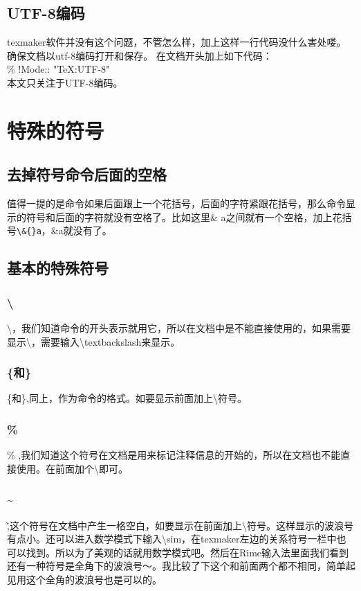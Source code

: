 \documentclass[12pt,oneside]{book}
\begin{document}
\begin{common-format}
\subsection{UTF-8编码}
texmaker软件并没有这个问题，不管怎么样，加上这样一行代码没什么害处喽。确保文档以utf-8编码打开和保存。
在文档开头加上如下代码：\\
\% !Mode:: "TeX:UTF-8" \\
本文只关注于UTF-8编码。


\section{特殊的符号}
\label{sec:symbols}
\subsection{去掉符号命令后面的空格}
值得一提的是命令如果后面跟上一个花括号，后面的字符紧跟花括号，那么命令显示的符号和后面的字符就没有空格了。比如这里\& a之间就有一个空格，加上花括号\verb+\&{}a+，\&{}a就没有了。

\subsection{基本的特殊符号}
\subsubsection{\textbackslash}
\textbackslash ，我们知道命令的开头表示就用它，所以在文档中是不能直接使用的，如果需要显示\textbackslash ，需要输入\textbackslash textbackslash来显示。

\subsubsection{\{和\}}
\{和\},同上，作为命令的格式。如要显示前面加上\textbackslash 符号。

\subsubsection{\%}
\% ,我们知道这个符号在文档是用来标记注释信息的开始的，所以在文档也不能直接使用。在前面加个\textbackslash 即可。

\subsubsection{\~{}}
\~ ,这个符号在文档中产生一格空白，如要显示在前面加上\textbackslash 符号。这样显示的波浪号有点小。还可以进入数学模式下输入\textbackslash sim，在texmaker左边的关系符号一栏中也可以找到。所以为了美观的话就用数学模式吧。然后在Rime输入法里面我们看到还有一种符号是全角下的波浪号～。我比较了下这个和前面两个都不相同，简单起见用这个全角的波浪号也是可以的。


\end{common-format}
\end{document}

